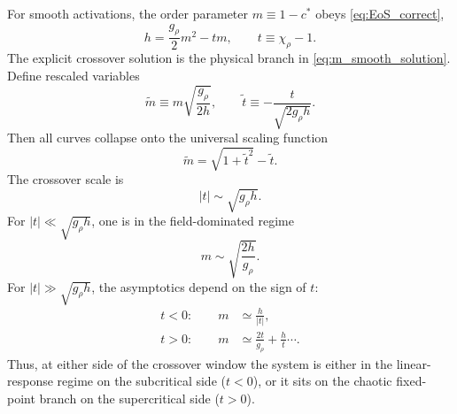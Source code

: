 \documentclass{article}
\theoremstyle{plain}
\theoremstyle{definition}
\theoremstyle{remark}
\begin{document}
For smooth activations, the order parameter \(m\equiv 1-c^*\) obeys \eqref{eq:EoS_correct},
\relax
\begin{equation}
h = \frac{g_\rho}{2} m^2 - t m, \qquad t \equiv \chi_\rho - 1.
\label{eq:eos_smooth_correct}
\end{equation}
\relax
The explicit crossover solution is the physical branch in \eqref{eq:m_smooth_solution}. Define rescaled variables
\relax
\begin{equation}
\tilde m \equiv m \sqrt{\frac{g_\rho}{2h}}, \qquad \tilde t \equiv -\frac{t}{\sqrt{2g_\rho h}}.
\label{eq:rescaled_vars_smooth}
\end{equation}
\relax
Then all curves collapse onto the universal scaling function
\relax
\begin{equation}
\tilde m = \sqrt{1+\tilde t^{2}}-\tilde t.
\label{eq:universal_scaling_function_smooth_correct}
\end{equation}
\relax
The crossover scale is
\relax
\begin{equation}
|t| \sim \sqrt{g_\rho h}.
\label{eq:crossover_scale_smooth}
\end{equation}
\relax
For \(|t| \ll \sqrt{g_\rho h}\), one is in the field-dominated regime
\relax
\begin{equation}
m \sim \sqrt{\frac{2h}{g_\rho}}.
\label{eq:field_dominated_smooth}
\end{equation}
\relax
For \(|t| \gg \sqrt{g_\rho h}\), the asymptotics depend on the sign of \(t\):
\relax
\begin{align}
t<0:\qquad m &\simeq \frac{h}{|t|},\\
t>0:\qquad m &\simeq \frac{2t}{g_\rho} + \frac{h}{t} \cdots.
\end{align}
\relax
Thus, at either side of the crossover window the system is either in the linear-response regime on the subcritical side (\(t<0\)), or it sits on the chaotic fixed-point branch on the supercritical side (\(t>0\)).
\end{document}
